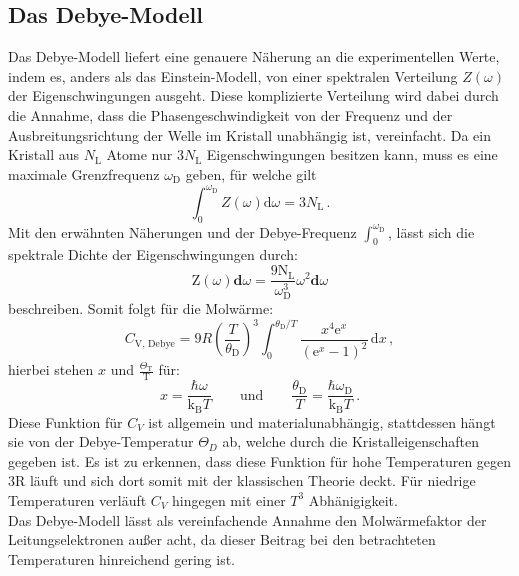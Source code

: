 \subsection{Das Debye-Modell}
Das Debye-Modell liefert eine genauere Näherung an die experimentellen Werte, indem es, anders als das Einstein-Modell, von einer spektralen Verteilung $Z(\omega)$ der Eigenschwingungen ausgeht.
Diese komplizierte Verteilung wird dabei durch die Annahme, dass die Phasengeschwindigkeit von der Frequenz und der Ausbreitungsrichtung der Welle im Kristall unabhängig ist, vereinfacht.
Da ein Kristall aus $N_\text{L}$ Atome nur $3N_\text{L}$ Eigenschwingungen besitzen kann, muss es eine maximale Grenzfrequenz $\omega_\text{D}$ geben, für welche gilt
\begin{equation}
  \int_0^{\omega_\text{D}} Z(\omega)\text{d}\omega = 3N_\text{L}\,.
  \label{eq:debyeintegral}
\end{equation}
Mit den erwähnten Näherungen und der Debye-Frequenz $\int_0^{\omega_\text{D}}$, lässt sich die spektrale Dichte der Eigenschwingungen durch:
\begin{equation}
  \text{Z}(\omega)\textbf{d}\omega= \frac{9\text{N}_\text{L}}{\omega_{\text{D}}^3}\omega^2\textbf{d}\omega
\end{equation}
beschreiben.
Somit folgt für die Molwärme:
\begin{equation}
 C_\text{V, Debye} = 9R \left(\frac{T}{\theta_\text{D}}\right)^3 \int_0^{\theta_\text{D}/T} \frac{x^4\text{e}^x}{(\text{e}^x-1)^2}\,\text{d}x \, ,
\end{equation}
hierbei stehen $x$ und $\frac{\Theta_\text{T}}{\text{T}}$ für:
\begin{equation}
  x = \frac{\hbar\omega}{\text{k}_\text{B}T} \qquad \text{und} \qquad \frac{\theta_\text{D}}{T} = \frac{\hbar\omega_\text{D}}{\text{k}_\text{B}T}\,.
\end{equation}
Diese Funktion für $C_V$ ist allgemein und materialunabhängig, stattdessen hängt sie von der Debye-Temperatur $\Theta_D$ ab, welche durch die Kristalleigenschaften gegeben ist. Es ist zu erkennen, dass diese Funktion
für hohe Temperaturen gegen 3R läuft und sich dort somit mit der klassischen Theorie deckt. Für niedrige Temperaturen verläuft $C_V$ hingegen mit einer $T^3$ Abhänigigkeit.\\
Das Debye-Modell lässt als vereinfachende Annahme den Molwärmefaktor der Leitungselektronen außer acht, da dieser Beitrag bei den betrachteten Temperaturen hinreichend gering ist.
